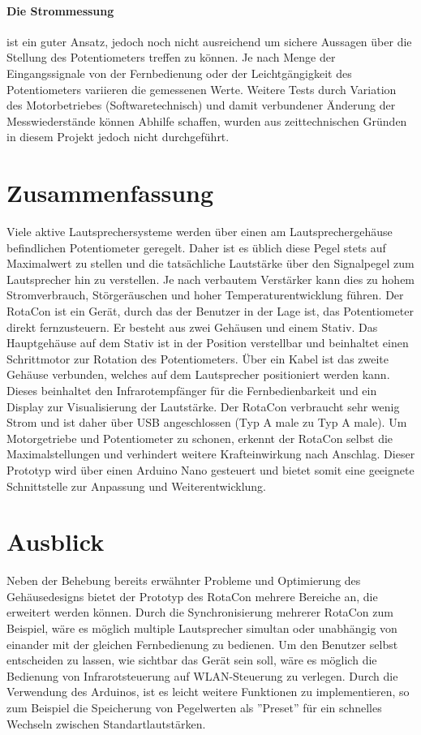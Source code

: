 \documentclass[11pt, titlepage]{report}
\begin{document}
			\paragraph{Die Strommessung}
			ist ein guter Ansatz, jedoch noch nicht ausreichend um sichere Aussagen über die Stellung des Potentiometers treffen zu können. Je nach Menge der Eingangssignale von der Fernbedienung oder der Leichtgängigkeit des Potentiometers variieren die gemessenen Werte. Weitere Tests durch Variation des Motorbetriebes (Softwaretechnisch) und damit verbundener Änderung der Messwiederstände können Abhilfe schaffen, wurden aus zeittechnischen Gründen in diesem Projekt jedoch nicht durchgeführt.

		\section{Zusammenfassung}
			Viele aktive Lautsprechersysteme werden über einen am Lautsprechergehäuse befindlichen Potentiometer geregelt. Daher ist es üblich diese Pegel stets auf Maximalwert zu stellen und die tatsächliche Lautstärke über den Signalpegel zum Lautsprecher hin zu verstellen. Je nach verbautem Verstärker kann dies zu hohem Stromverbrauch, Störgeräuschen und hoher Temperaturentwicklung führen. Der RotaCon ist ein Gerät, durch das der Benutzer in der Lage ist, das Potentiometer direkt fernzusteuern. Er besteht aus zwei Gehäusen und einem Stativ. Das Hauptgehäuse auf dem Stativ ist in der Position verstellbar und beinhaltet einen Schrittmotor zur Rotation des Potentiometers. Über ein Kabel ist das zweite Gehäuse verbunden, welches auf dem Lautsprecher positioniert werden kann. Dieses beinhaltet den Infrarotempfänger für die Fernbedienbarkeit und ein Display zur Visualisierung der Lautstärke. Der RotaCon verbraucht sehr wenig Strom und ist daher über USB angeschlossen (Typ A male zu Typ A male). Um Motorgetriebe und Potentiometer zu schonen, erkennt der RotaCon selbst die Maximalstellungen und verhindert weitere Krafteinwirkung nach Anschlag. Dieser Prototyp wird über einen Arduino Nano gesteuert und bietet somit eine geeignete Schnittstelle zur Anpassung und Weiterentwicklung.
		\section{Ausblick}
			Neben der Behebung bereits erwähnter Probleme und Optimierung des Gehäusedesigns bietet der Prototyp des RotaCon mehrere Bereiche an, die erweitert werden können. Durch die Synchronisierung mehrerer RotaCon zum Beispiel, wäre es möglich multiple Lautsprecher simultan oder unabhängig von einander mit der gleichen Fernbedienung zu bedienen. Um den Benutzer selbst entscheiden zu lassen, wie sichtbar das Gerät sein soll, wäre es möglich die Bedienung von Infrarotsteuerung auf WLAN-Steuerung zu verlegen. Durch die Verwendung des Arduinos, ist es leicht weitere Funktionen zu implementieren, so zum Beispiel die Speicherung von Pegelwerten als ''Preset'' für ein schnelles Wechseln zwischen Standartlautstärken.
\end{document}
